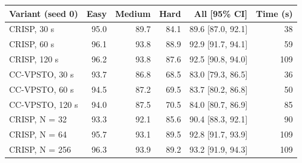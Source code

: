 \begin{tabular}{lrrrrr}
\toprule
Variant (seed 0) & Easy & Medium & Hard & All [95\% CI] & Time (s) \\
\midrule
CRISP, 30 s & 95.0 & 89.7 & 84.1 & 89.6 [87.0, 92.1] & 38 \\
CRISP, 60 s & 96.1 & 93.8 & 88.9 & 92.9 [91.7, 94.1] & 59 \\
CRISP, 120 s & 96.2 & 93.8 & 87.6 & 92.5 [90.8, 94.0] & 109 \\
CC-VPSTO, 30 s & 93.7 & 86.8 & 68.5 & 83.0 [79.3, 86.5] & 36 \\
CC-VPSTO, 60 s & 94.5 & 87.2 & 69.5 & 83.7 [80.2, 86.8] & 50 \\
CC-VPSTO, 120 s & 94.0 & 87.5 & 70.5 & 84.0 [80.7, 86.9] & 85 \\
\midrule
CRISP, N = 32 & 93.3 & 92.1 & 85.6 & 90.4 [88.3, 92.1] & 90 \\
CRISP, N = 64 & 95.7 & 93.1 & 89.5 & 92.8 [91.7, 93.9] & 109 \\
CRISP, N = 256 & 96.3 & 93.9 & 89.2 & 93.2 [91.9, 94.3] & 109 \\
\bottomrule
\end{tabular}
